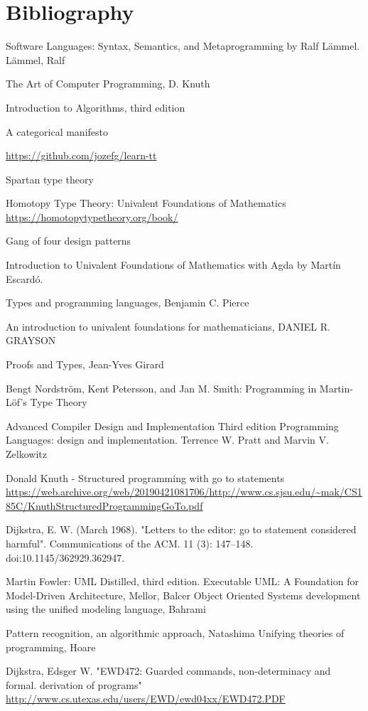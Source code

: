 \documentclass{report}
\begin{document}
\chapter{Bibliography}

 Software Languages: Syntax, Semantics, and Metaprogramming
by Ralf Lämmel.
Lämmel, Ralf

The Art of Computer Programming, D. Knuth

Introduction to Algorithms, third edition

A categorical manifesto

\url{https://github.com/jozefg/learn-tt}

Spartan type theory

Homotopy Type Theory:
Univalent Foundations of Mathematics
\url{https://homotopytypetheory.org/book/}

Gang of four design patterns

Introduction to Univalent Foundations of Mathematics with Agda by Martín Escardó.

Types and programming languages, Benjamin C. Pierce

An introduction to univalent foundations for mathematicians, DANIEL R. GRAYSON

Proofs and Types, Jean-Yves Girard

Bengt Nordström, Kent Petersson, and Jan M. Smith: Programming in Martin-Löf's Type Theory


Advanced Compiler Design and Implementation
Third edition Programming Languages: design and implementation. Terrence W. Pratt and Marvin V. Zelkowitz

Donald Knuth - Structured programming with go to statements \url{https://web.archive.org/web/20190421081706/http://www.cs.sjsu.edu/~mak/CS185C/KnuthStructuredProgrammingGoTo.pdf}

Dijkstra, E. W. (March 1968). "Letters to the editor: go to statement considered harmful". Communications of the ACM. 11 (3): 147–148. doi:10.1145/362929.362947. 

Martin Fowler: UML Distilled, third edition.
Executable UML: A Foundation for Model-Driven Architecture, Mellor, Balcer
Object Oriented Systems development using the unified modeling language, Bahrami

Pattern recognition, an algorithmic approach, Natashima
Unifying theories of programming, Hoare

Dijkstra, Edsger W. "EWD472: Guarded commands, non-determinacy and formal. derivation of programs" \url{http://www.cs.utexas.edu/users/EWD/ewd04xx/EWD472.PDF}
\end{document}

